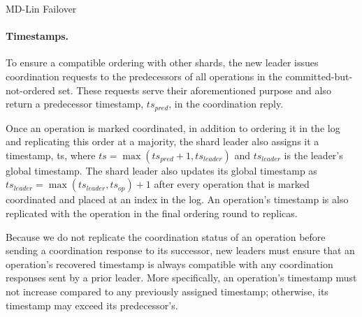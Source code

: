 \begin{algorithm}[!tb]
{        
    }
    \caption{MD-Lin Failover}
    \label{failover}
\end{algorithm}


\paragraph{Timestamps.}
To ensure a compatible ordering with other shards, the new leader issues coordination requests to the predecessors of all operations in the committed-but-not-ordered set.
These requests serve their aforementioned purpose and also return a predecessor timestamp, $ts_{pred}$, in the coordination reply. 

Once an operation is marked coordinated, in addition to ordering it in the log and replicating this order at a majority, the shard leader also assigns it a timestamp, ts, where $ts = \max(ts_{pred} + 1, ts_{leader})$ and $ts_{leader}$ is the leader's global timestamp. The shard leader also updates its global timestamp as $ts_{leader} = \max(ts_{leader}, ts_{op}) + 1$ after every operation that is marked coordinated and placed at an index in the log. An operation's timestamp is also replicated with the operation in the final ordering round to replicas.

Because we do not replicate the coordination status of an operation before sending a coordination response to its successor, new leaders must ensure that an operation's recovered timestamp is always compatible with any coordination responses sent by a prior leader. More specifically, an operation's timestamp must not increase compared to any previously assigned timestamp; otherwise, its timestamp may exceed its predecessor's.

